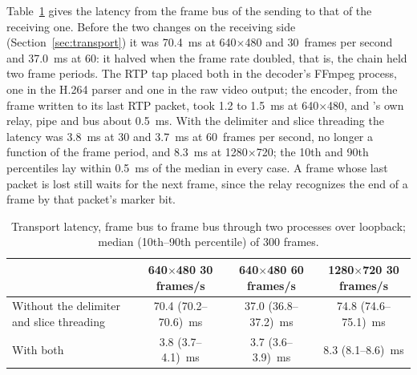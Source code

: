 Table~\ref{tab:latency} gives the latency from the frame bus of the sending
\hellion{} to that of the receiving one. Before the two changes on
the receiving side
(Section~\ref{sec:transport}) it was 70.4~ms at 640$\times$480 and 30~frames per
second and 37.0~ms at 60: it halved when the frame rate doubled, that
is, the chain
held two frame periods. The RTP tap placed both in the decoder's
FFmpeg process, one
in the H.264 parser and one in the raw video output; the encoder, from the frame
written to its last RTP packet, took 1.2 to 1.5~ms at 640$\times$480, and
\hellion{}'s own relay, pipe and bus about 0.5~ms. With the delimiter and slice
threading the latency was 3.8~ms at 30 and 3.7~ms at 60~frames per
second, no longer
a function of the frame period, and 8.3~ms at 1280$\times$720; the 10th and 90th
percentiles lay within 0.5~ms of the median in every case. A frame
whose last packet
is lost still waits for the next frame, since the relay recognizes
the end of a frame
by that packet's marker bit.

\begin{table}[!t]
  \centering\small
  \caption{Transport latency, frame bus to frame bus through two
    \hellion{} processes
    over loopback; median (10th--90th percentile) of 300
  frames.}\label{tab:latency}
  \begin{adjustbox}{max width=\linewidth}
    \begin{tabular}{@{}lccc@{}}
      \toprule
      & \makecell{640$\times$480\\30 frames/s} &
      \makecell{640$\times$480\\60 frames/s}
      & \makecell{1280$\times$720\\30 frames/s} \\
      \midrule
      Without the delimiter and slice threading & 70.4
      (70.2--70.6)~ms & 37.0 (36.8--37.2)~ms & 74.8 (74.6--75.1)~ms \\
      With both & 3.8 (3.7--4.1)~ms & 3.7 (3.6--3.9)~ms & 8.3 (8.1--8.6)~ms \\
      \bottomrule
    \end{tabular}
  \end{adjustbox}
\end{table}

